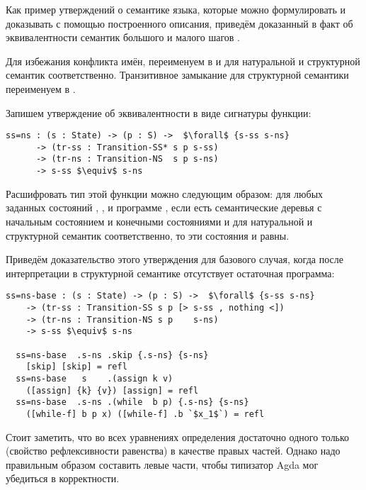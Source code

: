   Как пример утверждений о семантике языка, которые можно формулировать и доказывать с помощью построенного описания, приведём доказанный в \cite{Nielson:1992:SAF:129085} факт об эквивалентности семантик большого и малого шагов \KWhile.

  Для избежания конфликта имён, переименуем  в  и  для натуральной и структурной семантик соответственно. Транзитивное замыкание  для структурной семантики переименуем в .

  \noindent\begin{minipage}[c]{\linewidth}
  Запишем утверждение об эквивалентности в виде сигнатуры функции:
  \begin{lstlisting}[mathescape]
  ss=ns : (s : State) -> (p : S) ->  $\forall$ {s-ss s-ns}
      -> (tr-ss : Transition-SS* s p s-ss)
      -> (tr-ns : Transition-NS  s p s-ns)
      -> s-ss $\equiv$ s-ns
  \end{lstlisting}
  \end{minipage}

  Расшифровать тип этой функции можно следующим образом: для любых заданных состояний , ,  и программе , если есть семантические деревья  с начальным состоянием  и конечными состояниями  и  для натуральной и структурной семантик соответственно, то эти состояния  и  равны.

  Приведём доказательство этого утверждения для базового случая, когда после интерпретации в структурной семантике отсутствует остаточная программа:
  \begin{lstlisting}[mathescape]
  ss=ns-base : (s : State) -> (p : S) ->  $\forall$ {s-ss s-ns}
    -> (tr-ss : Transition-SS s p [> s-ss , nothing <])
    -> (tr-ns : Transition-NS s p    s-ns)
    -> s-ss $\equiv$ s-ns

  ss=ns-base  .s-ns .skip {.s-ns} {s-ns}
    [skip] [skip] = refl
  ss=ns-base   s    .(assign k v)
    ([assign] {k} {v}) [assign] = refl
  ss=ns-base  .s-ns .(while  b p) {.s-ns} {s-ns}
    ([while-f] b p x) ([while-f] .b `$x_1$`) = refl
  \end{lstlisting}

  Стоит заметить, что во всех уравнениях определения достаточно одного только  (свойство рефлексивности равенства) в качестве правых частей. Однако надо правильным образом составить левые части, чтобы типизатор Agda мог убедиться в корректности.


